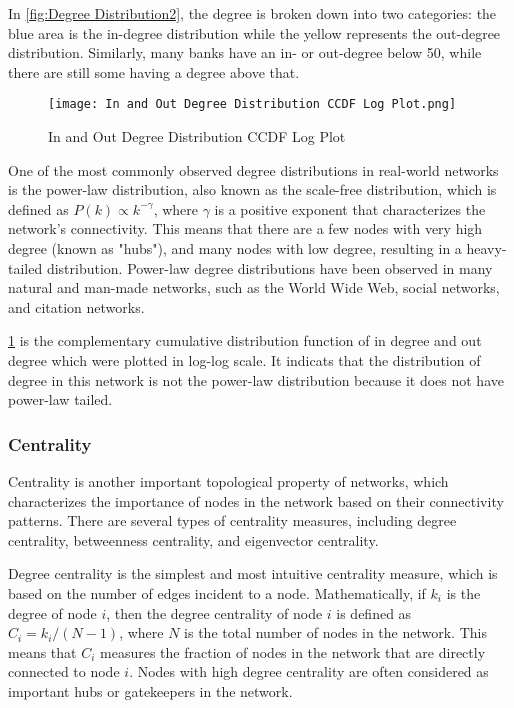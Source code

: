 In \ref{fig:Degree Distribution2}, the degree is broken down into two categories: the blue area is the in-degree distribution while the yellow represents the out-degree distribution. Similarly, many banks have an in- or out-degree below 50, while there are still some having a degree above that.

\begin{figure}[H]
    \centering
    \texttt{[image: In and Out Degree Distribution CCDF Log Plot.png]}
    \caption{In and Out Degree Distribution CCDF Log Plot}\label{fig:In and Out Degree Distribution CCDF Log Plot}
\end{figure}

One of the most commonly observed degree distributions in real-world networks is the power-law distribution, also known as the scale-free distribution, which is defined as $P(k)\varpropto k^{-\gamma}$, where $\gamma$ is a positive exponent that characterizes the network's connectivity. This means that there are a few nodes with very high degree (known as "hubs"), and many nodes with low degree, resulting in a heavy-tailed distribution. Power-law degree distributions have been observed in many natural and man-made networks, such as the World Wide Web, social networks, and citation networks.

\ref{fig:In and Out Degree Distribution CCDF Log Plot} is the complementary cumulative distribution function of in degree and out degree which were plotted in log-log scale. It indicats that the distribution of degree in this network is not the power-law distribution because it does not have power-law tailed.

\subsubsection{Centrality}
Centrality is another important topological property of networks, which characterizes the importance of nodes in the network based on their connectivity patterns. There are several types of centrality measures, including degree centrality, betweenness centrality, and eigenvector centrality.

Degree centrality\cite{freeman2002centrality} is the simplest and most intuitive centrality measure, which is based on the number of edges incident to a node. Mathematically, if $k_i$ is the degree of node $i$, then the degree centrality of node $i$ is defined as $C_i = k_i/(N-1)$, where $N$ is the total number of nodes in the network. This means that $C_i$ measures the fraction of nodes in the network that are directly connected to node $i$. Nodes with high degree centrality are often considered as important hubs or gatekeepers in the network.

